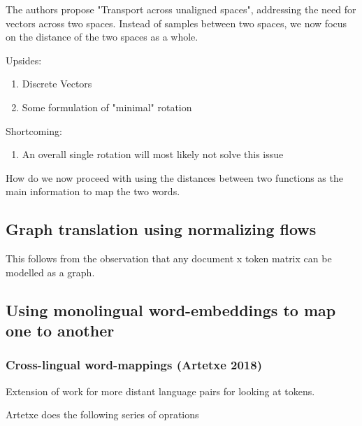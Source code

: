 \documentclass[a4paper,12pt,twoside,openright]{report}
\begin{document}
The authors propose "Transport across unaligned spaces", addressing the need for vectors across two spaces.
Instead of samples between two spaces, we now focus on the distance of the two spaces as a whole.


Upsides:
\begin{enumerate}
\item Discrete Vectors
\item Some formulation of "minimal" rotation
\end{enumerate}

Shortcoming:
\begin{enumerate}
\item An overall single rotation will most likely not solve this issue
\end{enumerate}



How do we now proceed with using the distances between two functions as the main information to map the two words.





\subsection{Graph translation using normalizing flows}

This follows from the observation that any document x token matrix can be modelled as a graph.



\subsection{Using monolingual word-embeddings to map one to another}

\subsubsection{Cross-lingual word-mappings (Artetxe 2018)}

Extension of work for more distant language pairs for looking at tokens.

Artetxe does the following series of oprations
\end{document}
